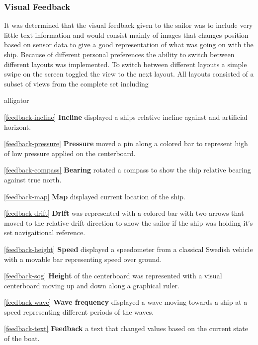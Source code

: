 \subsubsection{Visual Feedback}
It was determined that the visual feedback given to the sailor was to include very little text information and would consist mainly of images that changes position based on sensor data to give a good representation of what was going on with the ship. Because of different personal preferences the ability to switch between different layouts was implemented. To switch between different layouts a simple swipe on the screen toggled the view to the next layout. All layouts consisted of a subset of views from the complete set including
\begin{labeling}{alligator}
\item [\ref{feedback-incline} \textbf{Incline}]  displayed a ships relative incline against and artificial horizont.
\item [\ref{feedback-pressure} \textbf{Pressure}] moved a pin along a colored bar to represent high of low pressure applied on the centerboard.
\item [\ref{feedback-compass} \textbf{Bearing}] rotated a compass to show the ship relative bearing against true north.
\item [\ref{feedback-map} \textbf{Map}] displayed current location of the ship.
\item [\ref{feedback-drift} \textbf{Drift}] was represented with a colored bar with two arrows that moved to the relative drift direction to show the sailor if the ship was holding it's set navigaitional reference.
\item [\ref{feedback-height} \textbf{Speed}] displayed a speedometer from a classical Swedish vehicle\cite{volvo} with a movable bar representing speed over ground.
\item [\ref{feedback-sog} \textbf{Height}] of the centerboard was represented with a visual centerboard moving up and down along a graphical ruler.
\item [\ref{feedback-wave} \textbf{Wave frequency}] displayed a wave moving towards a ship at a speed representing different periods of the waves.
\item [\ref{feedback-text} \textbf{Feedback}] a text that changed values based on the current state of the boat.
\end{labeling}

